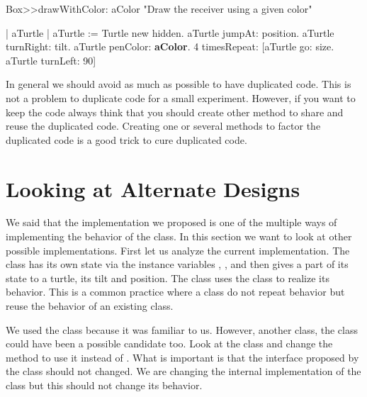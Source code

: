 \begin{method} \label{mt:drawWithColor}
Box>>drawWithColor: aColor 
   "Draw the receiver using a given color"
	
   | aTurtle |
   aTurtle := Turtle new hidden.
   aTurtle jumpAt: position.
   aTurtle turnRight: tilt.
   aTurtle penColor: \textbf{aColor}.
   4 timesRepeat: [aTurtle go: size.
                  aTurtle turnLeft: 90]
\end{method}


In general we should avoid as much as possible to have duplicated
code.  This is not a problem to duplicate code for a small experiment.
However, if you want to keep the code always think that you should
create other method to share and reuse the duplicated code. Creating
one or several methods to factor the duplicated code is a good trick
to cure duplicated code.





\section{Looking at Alternate  Designs}
We said that the implementation we proposed is one of the multiple
ways of implementing the behavior of the  class. In this
section we want to look at other possible implementations.  First let
us analyze the current implementation.  The class  has its own
state via the instance variables , , and
 then gives a part of its state to a turtle, its tilt and 
position.  The  class uses the  class to realize
its behavior.  This is a common practice where a class do not repeat
behavior but reuse the behavior of an existing class.

We used the class  because it was familiar to us.  However,
another class, the class  could have been a possible candidate
too.  Look at the class  and change the method
 to use it instead of .  What is
important is that the interface proposed by the class  should
not changed.  We are changing the internal implementation of the class
but this should not change its behavior.

